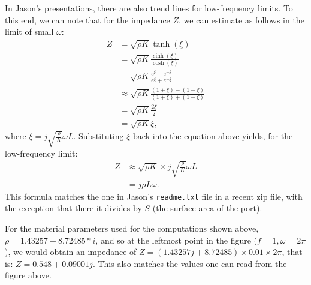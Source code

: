 \documentclass{article}
\begin{document}
In Jason's presentations, there are also trend lines for low-frequency
limits. To this end, we can note that for the impedance $Z$, we can
estimate as follows in the limit of small $\omega$:
\begin{align*}
  Z
  &= 
  \sqrt{\rho K}\tanh(\xi)
  \\
  &= 
  \sqrt{\rho K}
  \frac{\sinh(\xi)}
       {\cosh(\xi)}
  \\
  &= 
  \sqrt{\rho K}
  \frac{e^\xi - e^{-\xi}}
       {e^\xi + e^{-\xi}}
  \\
  &\approx
  \sqrt{\rho K}
  \frac{(1+\xi) - (1-\xi)}
       {(1+\xi) + (1-\xi)}
  \\ 
  &=
  \sqrt{\rho K}
  \frac{2\xi}
       {2}
  \\
  &=
  \sqrt{\rho K} \xi,
\end{align*}
where $\xi=j\sqrt{\frac{\rho}{K}}\omega L$. Substituting $\xi$ back
into the equation above yields, for the low-frequency limit:
\begin{align*}
  Z
  &\approx
  \sqrt{\rho K} \times j\sqrt{\frac{\rho}{K}}\omega L
  \\
  &=
  j \rho L \omega.
\end{align*}
This formula matches the one in Jason's \texttt{readme.txt} file in a
recent zip file, with the exception that there it divides by $S$ (the
surface area of the port).

For the material parameters used for the computations shown above, 
$\rho=1.43257-8.72485*i$, and so at the leftmost point in the figure
($f=1,\omega=2\pi$), we would obtain an impedance of $Z=
(1.43257j+8.72485) \times 0.01 \times 2\pi$, that is: 
$Z=0.548+0.09001j$. This also matches the values one can read from the
figure above.
\end{document}
